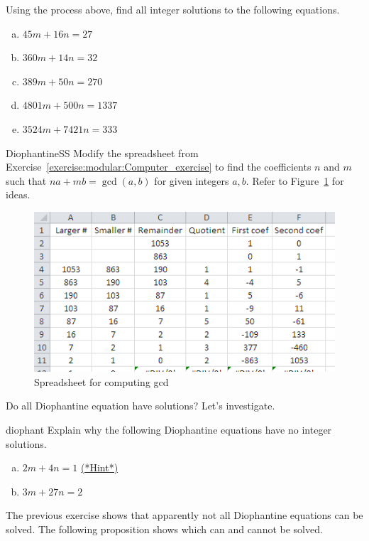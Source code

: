 \begin {exercise}{}
Using the process above, find all integer solutions to the following equations.
\begin {enumerate} [(a)]
\item
$45m + 16n = 27$
\item
$360m + 14n = 32$
\item
$389m + 50n = 270$
\item
$4801m + 500n = 1337$
\item
$ 3524m + 7421n = 333$
\end {enumerate}
\end {exercise}

\begin{exercise}{DiophantineSS}
Modify the spreadsheet from Exercise~\ref{exercise:modular:Computer_exercise} to find the coefficients $n$ and $m$ such that $na + mb = \gcd(a,b)$ for given integers $a,b$.  Refer to Figure~\ref{fig:gcd_spreadsheet_with_coefs} for ideas.
\end{exercise}

\begin{figure}[h]
\begin{center}
\includegraphics[width=4.5in]{images/gcd_spreadsheet_with_coefs.png}
\end{center}
\caption{Spreadsheet for computing gcd}\label{fig:gcd_spreadsheet_with_coefs}
\end{figure}


Do all  Diophantine equation have solutions? Let's investigate.

\begin {exercise}{diophant}
Explain why the following Diophantine equations have no integer solutions.
\begin {enumerate} [(a)]
\item
$2m + 4n = 1$
\hyperref[sec:modular_arithmetic:hints]{(*Hint*)}
\item
$3m + 27n = 2$
\end {enumerate}
\end {exercise}
The previous exercise shows that apparently not all Diophantine equations can be solved.  The following proposition shows which can and cannot be solved.

